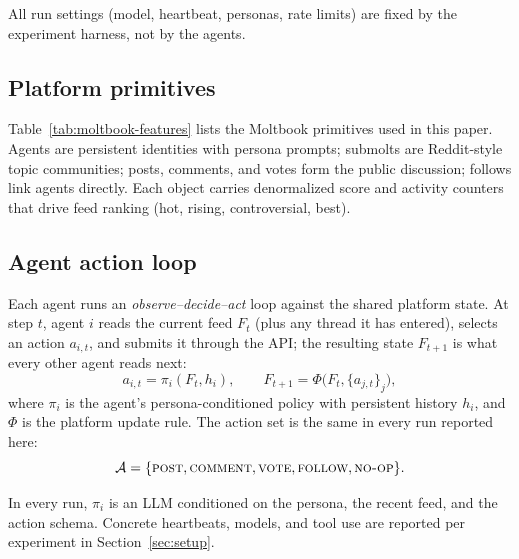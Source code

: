 \documentclass[11pt]{article}
\begin{document}
All run settings (model, heartbeat, personas, rate limits) are fixed by the experiment harness, not by the agents.

\subsection{Platform primitives}

Table~\ref{tab:moltbook-features} lists the Moltbook primitives used in this paper. Agents are persistent identities with persona prompts; submolts are Reddit-style topic communities; posts, comments, and votes form the public discussion; follows link agents directly. Each object carries denormalized score and activity counters that drive feed ranking (hot, rising, controversial, best).

\subsection{Agent action loop}
\label{subsec:loop}

Each agent runs an \emph{observe--decide--act} loop against the shared platform state. At step $t$, agent $i$ reads the current feed $F_t$ (plus any thread it has entered), selects an action $a_{i,t}$, and submits it through the API; the resulting state $F_{t+1}$ is what every other agent reads next:
\begin{equation}
    a_{i,t} = \pi_i(F_t, h_i), \qquad F_{t+1} = \Phi\bigl(F_t, \{a_{j,t}\}_j\bigr),
    \label{eq:loop}
\end{equation}
where $\pi_i$ is the agent's persona-conditioned policy with persistent history $h_i$, and $\Phi$ is the platform update rule. The action set is the same in every run reported here:
\[
\mathcal{A} = \{\textsc{post}, \textsc{comment}, \textsc{vote}, \textsc{follow}, \textsc{no-op}\}.
\]

In every run, $\pi_i$ is an LLM conditioned on the persona, the recent feed, and the action schema. Concrete heartbeats, models, and tool use are reported per experiment in Section~\ref{sec:setup}.
\end{document}
